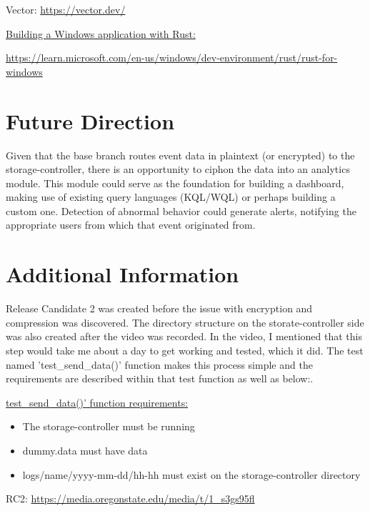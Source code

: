 \documentclass{article}
\begin{document}
Vector: \url{https://vector.dev/}\vspace{0.25cm}

\underline{Building a Windows application with Rust:}\vspace{0.25cm}

\url{https://learn.microsoft.com/en-us/windows/dev-environment/rust/rust-for-windows}

\newpage

\section{Future Direction}

Given that the base branch routes event data in plaintext (or encrypted) to the storage-controller, there is an opportunity to ciphon the data into an analytics module. This module could serve as the foundation for building a dashboard, making use of existing query languages (KQL/WQL) or perhaps building a custom one. Detection of abnormal behavior could generate alerts, notifying the appropriate users from which that event originated from.


\section{Additional Information}

Release Candidate 2 was created before the issue with encryption and compression was discovered. The directory structure on the storate-controller side was also created after the video was recorded. In the video, I mentioned that this step would take me about a day to get working and tested, which it did. The test named 'test\_send\_data()' function makes this process simple and the requirements are described within that test function as well as below:.\vspace{0.25cm}

\underline{test\_send\_data()' function requirements:}
\begin{itemize}
    \item{The storage-controller must be running}
    \item{dummy.data must have data}
    \item{logs/name/yyyy-mm-dd/hh-hh must exist on the storage-controller directory}
\end{itemize}


RC2: \url{https://media.oregonstate.edu/media/t/1\_s3gs95fl}
\end{document}
